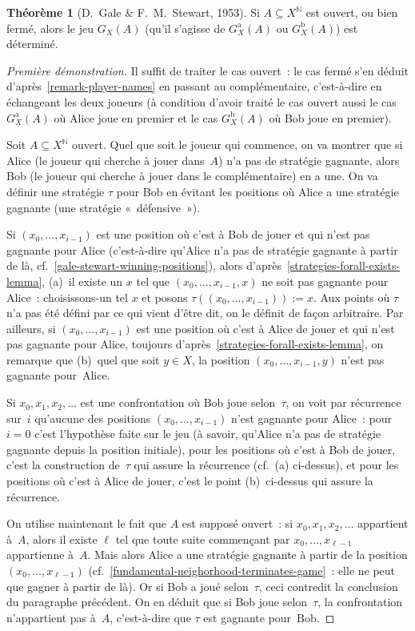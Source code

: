 \documentclass[12pt,a4paper]{article}
\theoremstyle{definition}
\newtheorem{thm}[comcnt]{Théorème}
\begin{document}
\begin{thm}[D. Gale \& F. M. Stewart, 1953]\label{gale-stewart-theorem}
Si $A \subseteq X^{\mathbb{N}}$ est ouvert, ou bien fermé, alors le
jeu $G_X(A)$ (qu'il s'agisse de $G_X^{\mathrm{a}}(A)$ ou
$G_X^{\mathrm{b}}(A)$) est déterminé.
\end{thm}
\begin{proof}[Première démonstration]
Il suffit de traiter le cas ouvert : le cas fermé s'en déduit
d'après \ref{remark-player-names} en passant au complémentaire,
c'est-à-dire en échangeant les deux joueurs (à condition d'avoir
traité le cas ouvert aussi le cas $G_X^{\mathrm{a}}(A)$ où Alice joue
en premier et le cas $G_X^{\mathrm{b}}(A)$ où Bob joue en premier).

Soit $A \subseteq X^{\mathbb{N}}$ ouvert.  Quel que soit le joueur qui
commence, on va montrer que si Alice (le joueur qui cherche à jouer
dans $A$) n'a pas de stratégie gagnante, alors Bob (le joueur qui
cherche à jouer dans le complémentaire) en a une.  On va définir une
stratégie $\tau$ pour Bob en évitant les positions où Alice a une
stratégie gagnante (une stratégie « défensive »).

Si $(x_0,\ldots,x_{i-1})$ est une position où c'est à Bob de jouer et
qui n'est pas gagnante pour Alice (c'est-à-dire qu'Alice n'a pas de
stratégie gagnante à partir de là,
cf. \ref{gale-stewart-winning-positions}), alors
d'après \ref{strategies-forall-exists-lemma}, (a) il existe un $x$ tel
que $(x_0,\ldots,x_{i-1},x)$ ne soit pas gagnante pour Alice :
choisissons-un tel $x$ et posons $\tau((x_0,\ldots,x_{i-1})) := x$.
Aux points où $\tau$ n'a pas été défini par ce qui vient d'être dit,
on le définit de façon arbitraire.  Par ailleurs, si
$(x_0,\ldots,x_{i-1})$ est une position où c'est à Alice de jouer et
qui n'est pas gagnante pour Alice, toujours
d'après \ref{strategies-forall-exists-lemma}, on remarque que (b) quel
que soit $y \in X$, la position $(x_0,\ldots,x_{i-1},y)$ n'est pas
gagnante pour Alice.

Si $x_0,x_1,x_2,\ldots$ est une confrontation où Bob joue
selon $\tau$, on voit par récurrence sur $i$ qu'aucune des positions
$(x_0,\ldots,x_{i-1})$ n'est gagnante pour Alice : pour $i=0$ c'est
l'hypothèse faite sur le jeu (à savoir, qu'Alice n'a pas de stratégie
gagnante depuis la position initiale), pour les positions où c'est à
Bob de jouer, c'est la construction de $\tau$ qui assure la récurrence
(cf. (a) ci-dessus), et pour les positions où c'est à Alice de jouer,
c'est le point (b) ci-dessus qui assure la récurrence.

On utilise maintenant le fait que $A$ est supposé ouvert : si
$x_0,x_1,x_2,\ldots$ appartient à $A$, alors il existe $\ell$ tel que
toute suite commençant par $x_0,\ldots,x_{\ell-1}$ appartienne à $A$.
Mais alors Alice a une stratégie gagnante à partir de la position
$(x_0,\ldots,x_{\ell-1})$
(cf. \ref{fundamental-neighorhood-terminates-game} : elle ne peut que
gagner à partir de là).  Or si Bob a joué selon $\tau$, ceci contredit
la conclusion du paragraphe précédent.  On en déduit que si Bob joue
selon $\tau$, la confrontation n'appartient pas à $A$, c'est-à-dire
que $\tau$ est gagnante pour Bob.
\end{proof}
\end{document}
